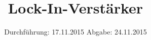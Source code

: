 

\subject{303}
\title{Lock-In-Verstärker}
\date{
  Durchführung: 17.11.2015
  \hspace{3em}
  Abgabe: 24.11.2015
}



\maketitle
\newpage
\mbox{}
\newpage
\thispagestyle{empty}
\tableofcontents
\newpage





\printbibliography



